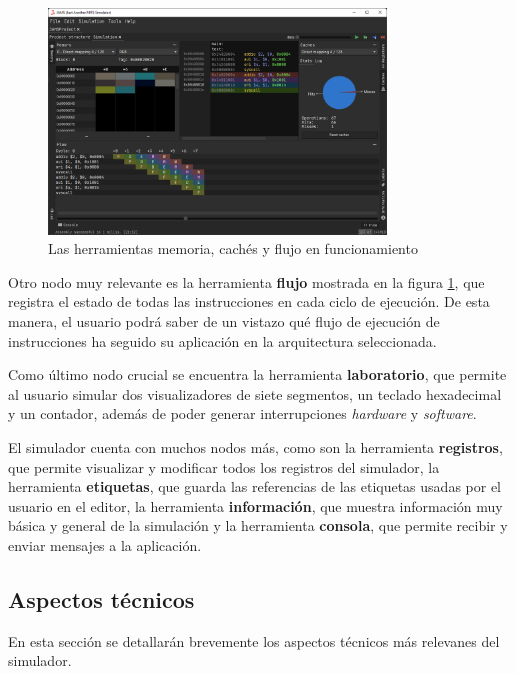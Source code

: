 \begin{figure}[h]
    \centering
    \includegraphics[width=0.8\textwidth]{images/tools/jams-memory-cache-flow}
    \caption{Las herramientas memoria, cachés y flujo en funcionamiento}
    \label{fig:jams-memory-cache-flow}
\end{figure}

Otro nodo muy relevante es la herramienta \textbf{flujo}
mostrada en la figura \ref{fig:jams-memory-cache-flow},
que registra el estado de todas las instrucciones en cada ciclo
de ejecución.
De esta manera, el usuario podrá saber de un vistazo qué flujo
de ejecución de instrucciones ha seguido su aplicación
en la arquitectura seleccionada.

Como último nodo crucial se encuentra la herramienta
\textbf{laboratorio}, que permite al usuario simular
dos visualizadores de siete segmentos, un teclado hexadecimal
y un contador, además de poder generar interrupciones \textit{hardware}
y \textit{software}.

El simulador cuenta con muchos nodos más, como son la
herramienta \textbf{registros}, que permite visualizar y modificar
todos los registros del simulador, la herramienta \textbf{etiquetas},
que guarda las referencias de las etiquetas usadas por el usuario
en el editor, la herramienta \textbf{información}, que muestra
información muy básica y general de la simulación y la
herramienta \textbf{consola}, que permite recibir y enviar
mensajes a la aplicación.

\subsection{Aspectos técnicos}\label{subsec:aspectos-tecnicos}

En esta sección se detallarán brevemente los aspectos técnicos
más relevanes del simulador.

